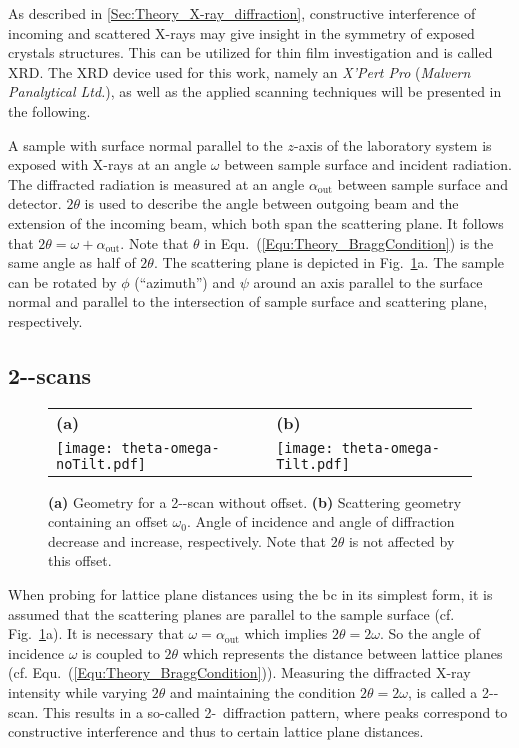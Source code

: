 As described in \ref{Sec:Theory_X-ray_diffraction}, constructive interference of incoming and scattered X-rays may give insight in the symmetry of exposed crystals structures.
This can be utilized for thin film investigation and is called \gls{XRD}.
The \gls{XRD} device used for this work, namely an \textit{X'Pert Pro} (\textit{Malvern Panalytical Ltd.}), as well as the applied scanning techniques will be presented in the following.

A sample with surface normal parallel to the $z$-axis of the laboratory system is exposed with X-rays at an angle $\omega$ between sample surface and incident radiation.
The diffracted radiation is measured at an angle $\alpha_\mathrm{out}$ between sample surface and detector.
$2\theta$ is used to describe the angle between outgoing beam and the extension of the incoming beam, which both span the scattering plane.
It follows that $2\theta=\omega+\alpha_\mathrm{out}$.
Note that $\theta$ in Equ.~(\ref{Equ:Theory_BraggCondition}) is the same angle as half of $2\theta$.
The scattering plane is depicted in Fig.~\ref{Fig:Methods_XRD_geometry}a.
The sample can be rotated by $\phi$ (\enquote{azimuth}) and $\psi$ around an axis parallel to the surface normal and parallel to the intersection of sample surface and scattering plane, respectively.

\subsection{2\texttheta-\textomega-scans}
    \label{Sec:Methods_2ThetaOmega}
\begin{figure}
    \centering
    \begin{tabular}{ll}
        \textbf{(a)}&\textbf{(b)}\\
        \texttt{[image: theta-omega-noTilt.pdf]}
        &\texttt{[image: theta-omega-Tilt.pdf]}
    \end{tabular}
    \caption{\textbf{(a)} Geometry for a 2\texttheta-\textomega-scan without offset. \textbf{(b)} Scattering geometry containing an offset $\omega_0$. Angle of incidence and angle of diffraction decrease and increase, respectively. Note that $2\theta$ is not affected by this offset.}
    \label{Fig:Methods_XRD_geometry}
\end{figure}
When probing for lattice plane distances using the \gls{bc} in its simplest form, it is assumed that the scattering planes are parallel to the sample surface (cf. Fig.~\ref{Fig:Methods_XRD_geometry}a).
It is necessary that $\omega=\alpha_\mathrm{out}$ which implies $2\theta=2\omega$.
So the angle of incidence $\omega$ is coupled to $2\theta$ which represents the distance between lattice planes (cf. Equ.~(\ref{Equ:Theory_BraggCondition})).
Measuring the diffracted X-ray intensity while varying $2\theta$ and maintaining the condition $2\theta=2\omega$, is called a 2\texttheta-\textomega-scan.
This results in a so-called 2\texttheta-\textomega\ diffraction pattern, where peaks correspond to constructive interference and thus to certain lattice plane distances.

